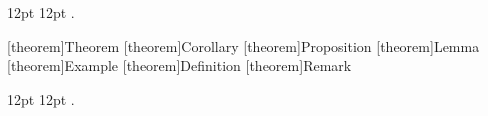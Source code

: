 \DeclareRobustCommand{\mybox}[1]{%
\begin{tcolorbox}[   %
        breakable,
        left=0pt,
        right=0pt,
        top=0pt,
        bottom=0pt,
        colback=shadethmcolor,
        colframe=shaderulecolor,
        width=\dimexpr\textwidth\relax, 
        enlarge left by=0mm,
        boxsep=5pt,
        arc=0pt,outer arc=0pt,
        ]
        #1
\end{tcolorbox}
\noindent \\[-12pt]
}

\setlength{\shadeboxrule}{1.2pt}   %
\setlength{\shadeboxsep}{7pt}
\setlength\shadedtextwidth{\dimexpr\textwidth-2\shadeboxsep\relax}
  {12pt}      %
  {12pt}      %
  {\itshape }  %
  {}          %
  {\bfseries\color{LMUgreen}} %
  {.}         %
  { }         %
  {}          %
\theoremstyle{shad} 

[theorem]{Theorem}
[theorem]{Corollary}
[theorem]{Proposition}
[theorem]{Lemma}
[theorem]{Example}
[theorem]{Definition}
[theorem]{Remark}

  {12pt}      %
  {12pt}      %
  {\itshape }  %
  {}          %
  {\bfseries\color{black}} %
  {.}         %
  { }         %
  {}          %
\theoremstyle{shad*} 

